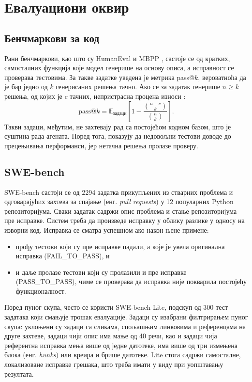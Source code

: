 \documentclass[12pt,a4paper]{report}
\begin{document}
	\section{Евалуациони оквир}

	\subsection{Бенчмаркови за код}

	Рани бенчмаркови, као што су HumanEval \parencite{chen2021humaneval} и
	MBPP \parencite{austin2021mbpp}, састоје се од кратких, самосталних
	функција које модел генерише на основу описа, а исправност се проверава
	тестовима. За такве задатке уведена је метрика pass@$k$, вероватноћа да је
	бар једно од $k$ генерисаних решења тачно. Ако се за задатак генерише
	$n \ge k$ решења, од којих је $c$ тачних, непристрасна процена износи
	\parencite{chen2021humaneval}:
	\begin{equation}
		\text{pass@}k = \mathbb{E}_{\text{задаци}}\left[1 - \frac{\binom{n-c}{k}}{\binom{n}{k}}\right].
	\end{equation}
	Такви задаци, међутим, не захтевају рад са постојећом кодном базом, што је
	суштина рада агената. Поред тога, \textcite{liu2023evalplus} показују да
	недовољни тестови доводе до прецењивања перформанси, јер нетачна решења
	пролазе проверу.

	\subsection{SWE-bench}

	SWE-bench \parencite{jimenez2024swebench} састоји се од 2294 задатка
	прикупљених из стварних проблема и одговарајућих захтева за спајање (енг.
	\textit{pull requests}) у 12 популарних Python репозиторијума. Сваки задатак
	садржи опис проблема и стање репозиторијума пре исправке. Систем треба да
	произведе исправку у облику разлике у односу на изворни код. Исправка се
	сматра успешном ако након њене примене:
	\begin{itemize}
		\item прођу тестови који су пре исправке падали, а које је увела
		оригинална исправка (FAIL\_TO\_PASS), и
		\item и даље пролазе тестови који су пролазили и пре исправке
		(PASS\_TO\_PASS), чиме се проверава да исправка није покварила постојећу
		функционалност.
	\end{itemize}
	Поред пуног скупа, често се користи SWE-bench Lite, подскуп од 300
	тест задатака који смањује трошак евалуације. Задаци су изабрани филтрирањем
	пуног скупа: уклоњени су задаци са сликама, спољашњим линковима и
	референцама на друге захтеве, задаци чији опис има мање од 40 речи, као и
	задаци чија референтна исправка мења више од једне датотеке, има више од
	три измењена блока (енг. \textit{hunks}) или креира и брише датотеке.
	Lite стога садржи самосталне, локализоване исправке грешака, што треба
	имати у виду при уопштавању резултата.
\end{document}
